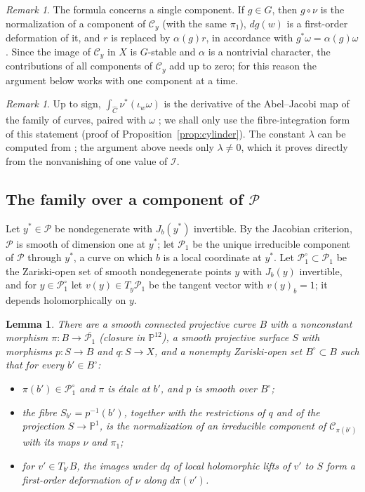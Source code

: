\documentclass[11pt]{amsart}
\newtheorem{lemma}[theorem]{Lemma}
\theoremstyle{definition}
\theoremstyle{remark}
\newtheorem{remark}[theorem]{Remark}
\numberwithin{equation}{section}
\newcommand{\PP}{\mathbb{P}}
\newcommand{\cP}{\mathcal{P}}
\newcommand{\cC}{\mathcal{C}}
\newcommand{\cI}{\mathcal{I}}
\begin{document}
\begin{remark}\label{rem:component}
The formula concerns a single component. If $g\in G$, then $g\circ\nu$ is the normalization of a component of $\cC_y$ (with the same $\pi_1$), $dg(w)$ is a first-order deformation of it, and $r$ is replaced by $\alpha(g)r$, in accordance with $g^*\omega=\alpha(g)\omega$. Since the image of $\cC_y$ in $X$ is $G$-stable and $\alpha$ is a nontrivial character, the contributions of all components of $\cC_y$ add up to zero; for this reason the argument below works with one component at a time.
\end{remark}

\begin{remark}\label{rem:CG}
Up to sign, $\int_{\widehat C}\nu^*(\iota_w\omega)$ is the derivative of the Abel--Jacobi map of the family of curves, paired with $\omega$ \cite[(6.41)]{Gr83}; we shall only use the fibre-integration form of this statement (proof of Proposition~\ref{prop:cylinder}). The constant $\lambda$ can be computed from \cite[Section~3(b)]{CG80}; the argument above needs only $\lambda\ne0$, which it proves directly from the nonvanishing of one value of $\cI$.
\end{remark}

\subsection{\texorpdfstring{The family over a component of $\cP$}{The family over a component of P}}\label{subsec:globalfamily}
Let $y^*\in\cP$ be nondegenerate with $J_b(y^*)$ invertible. By the Jacobian criterion, $\cP$ is smooth of dimension one at $y^*$; let $\cP_1$ be the unique irreducible component of $\cP$ through $y^*$, a curve on which $b$ is a local coordinate at $y^*$. Let $\cP_1^\circ\subset\cP_1$ be the Zariski-open set of smooth nondegenerate points $y$ with $J_b(y)$ invertible, and for $y\in\cP_1^\circ$ let $v(y)\in T_y\cP_1$ be the tangent vector with $v(y)_b=1$; it depends holomorphically on $y$.

\begin{lemma}\label{lem:family}
There are a smooth connected projective curve $B$ with a nonconstant morphism $\pi\colon B\to\overline{\cP_1}$ (closure in $\PP^{12}$), a smooth projective surface $S$ with morphisms $p\colon S\to B$ and $q\colon S\to X$, and a nonempty Zariski-open set $B^\circ\subset B$ such that for every $b'\in B^\circ$:
\begin{itemize}
\item[(i)] $\pi(b')\in\cP_1^\circ$ and $\pi$ is \'etale at $b'$, and $p$ is smooth over $B^\circ$;
\item[(ii)] the fibre $S_{b'}=p^{-1}(b')$, together with the restrictions of $q$ and of the projection $S\to\PP^1$, is the normalization of an irreducible component of $\cC_{\pi(b')}$ with its maps $\nu$ and $\pi_1$;
\item[(iii)] for $v'\in T_{b'}B$, the images under $dq$ of local holomorphic lifts of $v'$ to $S$ form a first-order deformation of $\nu$ along $d\pi(v')$.
\end{itemize}
\end{lemma}
\end{document}
